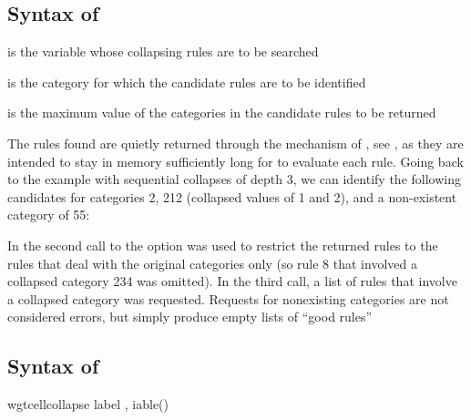 \begin{stlog}
\nullskip
\end{stlog}


\subsection{Syntax of }


\hangpara
{} is the variable whose collapsing rules are to be searched

\hangpara
{} is the category for which the candidate rules are to be identified

\hangpara
{} is the maximum value of the categories in the candidate rules to be returned

The rules found are quietly returned through the mechanism of ,
see , as they are intended to stay in memory sufficiently long for
 to evaluate each rule. Going back to the example
with sequential collapses of depth 3, we can identify the following candidates
for categories 2, 212 (collapsed values of 1 and 2), and a non-existent category of 55:

\begin{stlog}
\nullskip
\end{stlog}

In the second call to
the option  was used to restrict the returned rules to the rules
that deal with the original categories only (so rule 8 that involved a collapsed category 234 
was omitted). In the third call, a list of rules
that involve a collapsed category  was requested. Requests
for nonexisting categories are not considered errors, but simply produce empty lists
of ``good rules''

\subsection{Syntax of }

\begin{stsyntax}
wgtcellcollapse label
,
iable(\varname)
\end{stsyntax}

